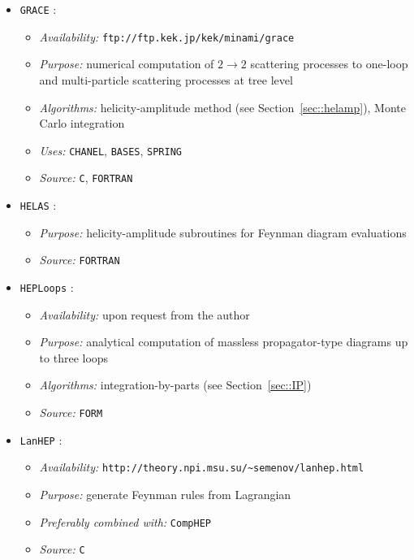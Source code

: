 \begin{itemize}

\item {\tt GRACE} \cite{grace}:
  \begin{itemize}
  \item {\it Availability:} {\tt ftp://ftp.kek.jp/kek/minami/grace}
  \item {\it Purpose:} numerical computation of $2\to 2$ scattering
    processes to one-loop and multi-particle scattering processes at
    tree level
  \item {\it Algorithms:} helicity-amplitude method (see
    Section~\ref{sec::helamp}), Monte Carlo integration
  \item {\it Uses:} {\tt CHANEL}, {\tt BASES}, {\tt SPRING}
  \item{\it Source:} {\tt C}, {\tt FORTRAN}
  \end{itemize}


\item {\tt HELAS} \cite{HELAS}:
  \begin{itemize}
  \item{\it Purpose:} helicity-amplitude subroutines for Feynman diagram
    evaluations 
  \item{\it Source:} {\tt FORTRAN}
  \end{itemize}


\item {\tt HEPLoops} \cite{HEPLoops}:
 \begin{itemize}
  \item {\it Availability:} upon request from the author
  \item{\it Purpose:} analytical computation of massless propagator-type
    diagrams up to three loops
  \item {\it Algorithms:} integration-by-parts (see Section~\ref{sec::IP})
  \item {\it Source:} {\tt FORM}
  \end{itemize}


\item {\tt LanHEP} \cite{lanhep}:
  \begin{itemize}
  \item {\it Availability:}
    {\tt http://theory.npi.msu.su/\~\/semenov/lanhep.html}
  \item {\it Purpose:} generate Feynman rules from Lagrangian
  \item {\it Preferably combined with:} {\tt CompHEP}
  \item{\it Source:} {\tt C}
  \end{itemize}


\end{itemize}
